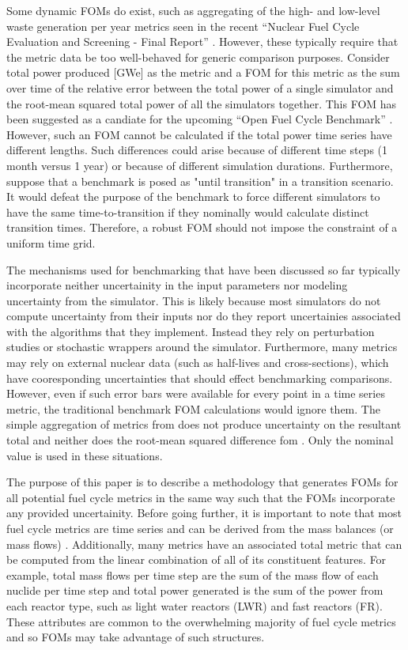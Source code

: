 Some dynamic FOMs do exist, such as aggregating of the high- and low-level
waste generation per year metrics seen in the recent 
``Nuclear Fuel Cycle Evaluation and Screening - Final Report'' 
\cite{wigeland2014nuclear}. However, these typically require that the metric
data be too well-behaved for generic comparison purposes. Consider  
total power produced [GWe] as the metric and a FOM for this metric as 
the sum over time of the relative error 
between the total power of a single simulator and the root-mean squared 
total power of all the simulators together. This FOM has been suggested as
a candiate for the upcoming ``Open Fuel Cycle Benchmark'' 
\cite{mouginot2015ofcb}. However, such an FOM cannot be calculated 
if the total power
time series have different lengths. Such differences could arise because 
of different time steps (1 month versus 1 year) or because of different 
simulation durations. Furthermore, suppose that a benchmark is posed as 
"until transition" in a transition scenario. It would defeat the purpose of 
the benchmark to force different simulators to have the same 
time-to-transition if they nominally would calculate distinct transition 
times. Therefore, a robust FOM should not impose the constraint of a uniform time grid.
 
The mechanisms used for benchmarking that have been discussed so far typically
incorporate neither uncertainity in the input parameters nor 
modeling uncertainty from the simulator.
This is likely because most simulators do not compute uncertainty from their
inputs nor do they report uncertainies associated with the algorithms that 
they implement. 
Instead they rely on perturbation studies or stochastic wrappers around 
the simulator. Furthermore, many metrics may rely on external nuclear 
data (such as half-lives and cross-sections), which have cooresponding 
uncertainties that should effect benchmarking comparisons. 
However, even if such error bars were available for
every point in a time series metric, the traditional benchmark FOM 
calculations would ignore them. The simple aggregation of metrics from 
\cite{wigeland2014nuclear} does not produce uncertainty on the resultant
total and neither does the root-mean squared difference fom 
\cite{mouginot2015ofcb}. Only the nominal value is used in these situations.

The purpose of this paper is to describe a methodology that generates FOMs
for all potential fuel cycle metrics in the same way such that the FOMs 
incorporate any provided uncertainity. 
Before going further, it is important to note that 
most fuel cycle 
metrics are time series and can be derived from the mass balances (or 
mass flows) \cite{wilson2011comparing,guerin2009benchmark,piet2011assessment,wigeland2014nuclear}. 
Additionally, many metrics have an associated total metric that can be 
computed from the linear combination of all of its constituent features. 
For example, total mass flows per time step are the sum of the mass flow 
of each nuclide per time step
and total power generated is the sum of the power from each reactor type, 
such as light water reactors (LWR) and fast reactors (FR). These attributes 
are common to the overwhelming majority of fuel cycle metrics and so FOMs
may take advantage of such structures.

